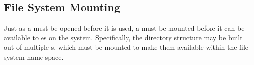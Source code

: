 \subsection{File System Mounting}\label{subsec:File_System_Mounting}
Just as a  must be opened before it is used, a  must be mounted before it can be available to es on the system.
Specifically, the directory structure may be built out of multiple s, which must be mounted to make them available within the file-system name space.


